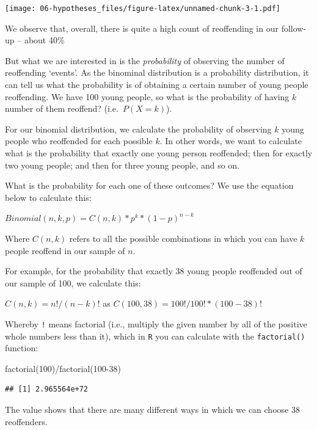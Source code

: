 \documentclass[
]{book}
\newenvironment{Shaded}{\begin{snugshade}}{\end{snugshade}}
\newcommand{\DecValTok}[1]{\textcolor[rgb]{0.00,0.00,0.81}{#1}}
\newcommand{\FunctionTok}[1]{\textcolor[rgb]{0.00,0.00,0.00}{#1}}
\newcommand{\NormalTok}[1]{#1}
\newcommand{\SpecialCharTok}[1]{\textcolor[rgb]{0.00,0.00,0.00}{#1}}
\begin{document}
\texttt{[image: 06-hypotheses\_files/figure-latex/unnamed-chunk-3-1.pdf]}

We observe that, overall, there is quite a high count of reoffending in our follow-up -- about 40\%

But what we are interested in is the \emph{probability} of observing the number of reoffending `events'. As the binominal distribution is a probability distribution, it can tell us what the probability is of obtaining a certain number of young people reoffending. We have 100 young people, so what is the probability of having \(k\) number of them reoffend? (i.e.~\(P(X=k)\)).

For our binomial distribution, we calculate the probability of observing \(k\) young people who reoffended for each possible \(k\). In other words, we want to calculate what is the probability that exactly one young person reoffended; then for exactly two young people; and then for three young people, and so on.

What is the probability for each one of these outcomes? We use the equation below to calculate this:

\(Binomial(n,k,p) = C(n,k) * p^k * (1-p)^{n-k}\)

Where \(C(n,k)\) refers to all the possible combinations in which you can have \(k\) people reoffend in our sample of \(n\).

For example, for the probability that exactly 38 young people reoffended out of our sample of 100, we calculate this:

\(C(n,k) = {n!}/{(n-k)!}\) as \(C(100,38) = {100!}/{100!*(100-38)!}\)

Whereby \texttt{!} means factorial (i.e., multiply the given number by all of the positive whole numbers less than it), which in \texttt{R} you can calculate with the \texttt{factorial()} function:

\begin{Shaded}
\begin{Highlighting}[]
\FunctionTok{factorial}\NormalTok{(}\DecValTok{100}\NormalTok{)}\SpecialCharTok{/}\FunctionTok{factorial}\NormalTok{(}\DecValTok{100{-}38}\NormalTok{)}
\end{Highlighting}
\end{Shaded}

\begin{verbatim}
## [1] 2.965564e+72
\end{verbatim}

The value shows that there are many different ways in which we can choose 38 reoffenders.
\end{document}
